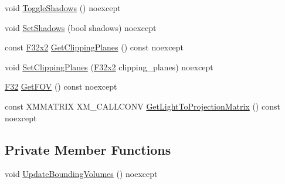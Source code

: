 \begin{DoxyCompactItemize}
void \hyperlink{classmage_1_1rendering_1_1_spot_light_a4e6412e05d894a97409c23d8d088cabf}{Toggle\+Shadows} () noexcept
\item 
void \hyperlink{classmage_1_1rendering_1_1_spot_light_af1f1d3aee8bdcda50d16f4b0551e4728}{Set\+Shadows} (bool shadows) noexcept
\item 
const \hyperlink{namespacemage_aa87237ad091f5cd7da612b8523fc108f}{F32x2} \hyperlink{classmage_1_1rendering_1_1_spot_light_ae3149920d30b92433025fcd4bc8188e9}{Get\+Clipping\+Planes} () const noexcept
\item 
void \hyperlink{classmage_1_1rendering_1_1_spot_light_a9a4c2e827e91d7ec79118217376c9c6e}{Set\+Clipping\+Planes} (\hyperlink{namespacemage_aa87237ad091f5cd7da612b8523fc108f}{F32x2} clipping\+\_\+planes) noexcept
\item 
\hyperlink{namespacemage_aa97e833b45f06d60a0a9c4fc22ae02c0}{F32} \hyperlink{classmage_1_1rendering_1_1_spot_light_a22527d940bc7601285429b36e8d97490}{Get\+F\+OV} () const noexcept
\item 
const X\+M\+M\+A\+T\+R\+IX X\+M\+\_\+\+C\+A\+L\+L\+C\+O\+NV \hyperlink{classmage_1_1rendering_1_1_spot_light_ad617d1c098e2ca222a9736b8c45fa0c8}{Get\+Light\+To\+Projection\+Matrix} () const noexcept
\end{DoxyCompactItemize}
\subsection*{Private Member Functions}
\begin{DoxyCompactItemize}
\item 
void \hyperlink{classmage_1_1rendering_1_1_spot_light_aa225a105edf22a1a430a1c3aa42bc490}{Update\+Bounding\+Volumes} () noexcept
\end{DoxyCompactItemize}
